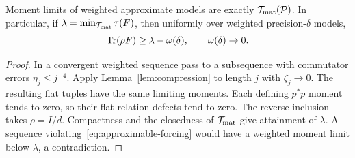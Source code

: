 \begin{corollary}\label{cor:weighted-limits}
Moment limits of weighted approximate models are exactly $\mathcal T_{\rm mat}(\mathcal P)$. In particular, if $\lambda=\min_{\mathcal T_{\rm mat}}\tau(F)$, then uniformly over weighted precision-$\delta$ models,
\begin{equation}\label{eq:approximable-forcing}
 \operatorname{Tr}(\rho F)\ge\lambda-\omega(\delta),\qquad \omega(\delta)\to0.
\end{equation}
\end{corollary}
\begin{proof}
In a convergent weighted sequence pass to a subsequence with commutator errors $\eta_j\le j^{-4}$. Apply Lemma~\ref{lem:compression} to length $j$ with $\zeta_j\to0$. The resulting flat tuples have the same limiting moments. Each defining $p^*p$ moment tends to zero, so their flat relation defects tend to zero. The reverse inclusion takes $\rho=I/d$. Compactness and the closedness of $\mathcal T_{\rm mat}$ give attainment of $\lambda$. A sequence violating~\eqref{eq:approximable-forcing} would have a weighted moment limit below $\lambda$, a contradiction.
\end{proof}

